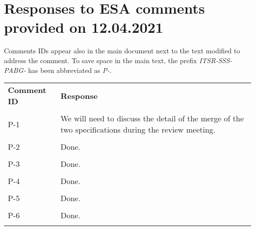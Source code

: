 
\section{Responses to ESA comments provided on 12.04.2021}
\label{sec:ESA:comments:1}

Comments IDs appear also in the main document next to the text modified to address the comment. To save space in the main text, the prefix \emph{ITSR-SSS-PABG-} has been abbreviated as \emph{P-}.

\setlength\LTleft{0pt}
\setlength\LTright{0pt}
\tiny 
\begin{longtable}{|p{1.5cm}|p{12cm}|@{}}
\textbf{Comment ID}&\textbf{Response}\\
\\
\hline
P-1&
\begin{minipage}{12cm}
We will need to discuss the detail of the merge of the two specifications during the review meeting.
\end{minipage}\\
\\
\hline

P-2&
\begin{minipage}{12cm}
Done.
\end{minipage}\\
\\
\hline

P-3&
\begin{minipage}{12cm}
Done.
\end{minipage}\\
\\
\hline

P-4&
\begin{minipage}{12cm}
Done.
\end{minipage}\\
\\
\hline

P-5&
\begin{minipage}{12cm}
Done.
\end{minipage}\\
\\
\hline

P-6&
\begin{minipage}{12cm}
Done.
\end{minipage}\\
\\
\hline


\end{longtable}
